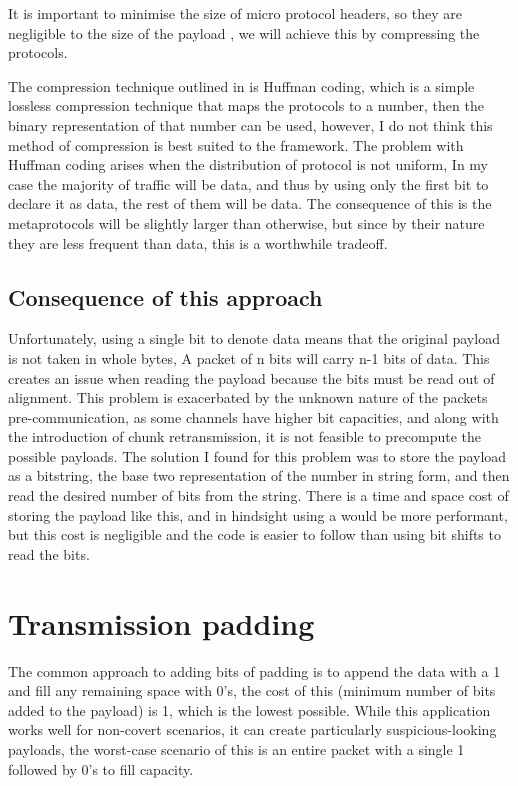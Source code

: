 It is important to minimise the size of micro protocol headers, so they are negligible to the size of the payload \citep{DRiCCBoCP}, we will achieve this by compressing the protocols.

The compression technique outlined in  is Huffman coding, which is a simple lossless compression technique that maps the protocols to a number, then the binary representation of that number can be used, however, I do not think this method of compression is best suited to the framework. The problem with Huffman coding arises when the distribution of protocol is not uniform, In my case the majority of traffic will be data, and thus by using only the first bit to declare it as data, the rest of them will be data. The consequence of this is the metaprotocols will be slightly larger than otherwise, but since by their nature they are less frequent than data, this is a worthwhile tradeoff.

\subsection{Consequence of this approach}
\label{sec:mp_consequence}

Unfortunately, using a single bit to denote data means that the original payload is not taken in whole bytes, A packet of n bits will carry n-1 bits of data. This creates an issue when reading the payload because the bits must be read out of alignment. This problem is exacerbated by the unknown nature of the packets pre-communication, as some channels have higher bit capacities, and along with the introduction of chunk retransmission, it is not feasible to precompute the possible payloads. The solution I found for this problem was to store the payload as a bitstring, the base two representation of the number in string form, and then read the desired number of bits from the string. There is a time and space cost of storing the payload like this, and in hindsight using a  would be more performant, but this cost is negligible and the code is easier to follow than using bit shifts to read the bits.

\section{Transmission padding}
\label{sec:transmission_padding}

The common approach to adding bits of padding is to append the data with a 1 and fill any remaining space with 0's, the cost of this (minimum number of bits added to the payload) is 1, which is the lowest possible. While this application works well for non-covert scenarios, it can create particularly suspicious-looking payloads, the worst-case scenario of this is an entire packet with a single 1 followed by 0's to fill capacity.

